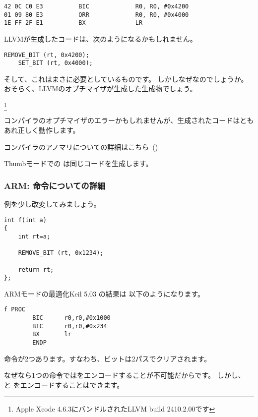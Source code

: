 \begin{lstlisting}[caption=\OptimizingXcodeIV (\ARMMode),label=ARM_leaf_example3,style=customasmARM]
42 0C C0 E3          BIC             R0, R0, #0x4200
01 09 80 E3          ORR             R0, R0, #0x4000
1E FF 2F E1          BX              LR
\end{lstlisting}

LLVMが生成したコードは、次のようになるかもしれません。

\begin{lstlisting}[style=customc]
    REMOVE_BIT (rt, 0x4200);
    SET_BIT (rt, 0x4000);
\end{lstlisting}

そして、これはまさに必要としているものです。
しかしなぜなのでしょうか。
おそらく、LLVMのオプチマイザが生成した生成物でしょう。

\footnote{Apple Xcode 4.6.3にバンドルされたLLVM build 2410.2.00です}

コンパイラのオプチマイザのエラーかもしれませんが、生成されたコードはともあれ正しく動作します。

コンパイラのアノマリについての詳細はこちら~()

Thumbモードでの \OptimizingXcodeIV は同じコードを生成します。

\subsubsection{ARM:  命令についての詳細}

例を少し改変してみましょう。

\begin{lstlisting}[style=customc]
int f(int a)
{
    int rt=a;

    REMOVE_BIT (rt, 0x1234);

    return rt;
};
\end{lstlisting}

ARMモードの最適化Keil 5.03 の結果は
以下のようになります。

\begin{lstlisting}[style=customasmARM]
f PROC
        BIC      r0,r0,#0x1000
        BIC      r0,r0,#0x234
        BX       lr
        ENDP
\end{lstlisting}

命令が2つあります。すなわち、ビットは2パスでクリアされます。

なぜなら1つの命令ではをエンコードすることが不可能だからです。
しかし、 と をエンコードすることはできます。

